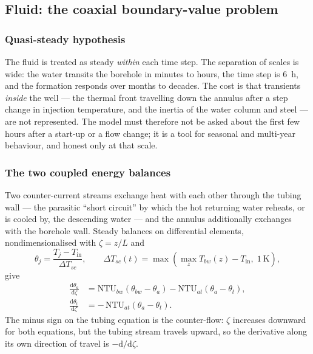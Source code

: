 \subsection{Fluid: the coaxial boundary-value problem}
\label{sec:dbhe:fluid}

\subsubsection{Quasi-steady hypothesis}
The fluid is treated as steady \emph{within} each time step. The separation of
scales is wide: the water transits the borehole in minutes to hours, the time
step is \SI{6}{\hour}, and the formation responds over months to decades. The
cost is that transients \emph{inside} the well --- the thermal front travelling
down the annulus after a step change in injection temperature, and the inertia
of the water column and steel --- are not represented. The model must therefore
not be asked about the first few hours after a start-up or a flow change; it is
a tool for seasonal and multi-year behaviour, and honest only at that scale.

\subsubsection{The two coupled energy balances}
Two counter-current streams exchange heat with each other through the tubing
wall --- the parasitic ``short circuit'' by which the hot returning water reheats,
or is cooled by, the descending water --- and the annulus additionally exchanges
with the borehole wall. Steady balances on differential elements, nondimensionalised
with $\zeta=z/L$ and
\begin{equation}
\theta_j=\frac{T_j-T_{\mathrm{in}}}{\Delta T_{sc}}, \qquad \Delta
T_{sc}(t)=\max\!\left(\max_z T_{bw}(z)-T_{\mathrm{in}},\;\SI{1}{\kelvin}\right),
\label{eq:dbhe:scale}
\end{equation}
give
\begin{align}
\frac{\mathrm{d}\theta_a}{\mathrm{d}\zeta}
&=\mathrm{NTU}_{bw}\left(\theta_{bw}-\theta_a\right)
-\mathrm{NTU}_{at}\left(\theta_a-\theta_t\right),
\label{eq:dbhe:bvpa}\\[2pt]
\frac{\mathrm{d}\theta_t}{\mathrm{d}\zeta}
&=-\,\mathrm{NTU}_{at}\left(\theta_a-\theta_t\right).
\label{eq:dbhe:bvpt}
\end{align}
The minus sign on the tubing equation is the counter-flow: $\zeta$ increases
downward for both equations, but the tubing stream travels upward, so the
derivative along its own direction of travel is $-\mathrm{d}/\mathrm{d}\zeta$.

